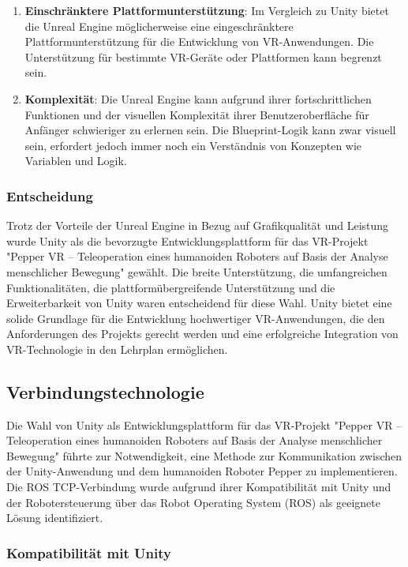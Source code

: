 \begin{enumerate}
\item \textbf{Einschränktere Plattformunterstützung}: Im Vergleich zu Unity bietet die Unreal Engine möglicherweise eine eingeschränktere Plattformunterstützung für die Entwicklung von VR-Anwendungen. Die Unterstützung für bestimmte VR-Geräte oder Plattformen kann begrenzt sein.
\item \textbf{Komplexität}: Die Unreal Engine kann aufgrund ihrer fortschrittlichen Funktionen und der visuellen Komplexität ihrer Benutzeroberfläche für Anfänger schwieriger zu erlernen sein. Die Blueprint-Logik kann zwar visuell sein, erfordert jedoch immer noch ein Verständnis von Konzepten wie Variablen und Logik.
\end{enumerate}

\subsubsection{Entscheidung}

Trotz der Vorteile der Unreal Engine in Bezug auf Grafikqualität und Leistung wurde Unity als die bevorzugte Entwicklungsplattform für das VR-Projekt "Pepper VR – Teleoperation eines humanoiden Roboters auf Basis der Analyse menschlicher Bewegung" gewählt. Die breite Unterstützung, die umfangreichen Funktionalitäten, die plattformübergreifende Unterstützung und die Erweiterbarkeit von Unity waren entscheidend für diese Wahl. Unity bietet eine solide Grundlage für die Entwicklung hochwertiger VR-Anwendungen, die den Anforderungen des Projekts gerecht werden und eine erfolgreiche Integration von VR-Technologie in den Lehrplan ermöglichen.
\subsection{Verbindungstechnologie}
Die Wahl von Unity als Entwicklungsplattform für das VR-Projekt "Pepper VR – Teleoperation eines humanoiden Roboters auf Basis der Analyse menschlicher Bewegung" führte zur Notwendigkeit, eine Methode zur Kommunikation zwischen der Unity-Anwendung und dem humanoiden Roboter Pepper zu implementieren. Die ROS TCP-Verbindung wurde aufgrund ihrer Kompatibilität mit Unity und der Robotersteuerung über das Robot Operating System (ROS) als geeignete Lösung identifiziert.

\subsubsection{Kompatibilität mit Unity}

